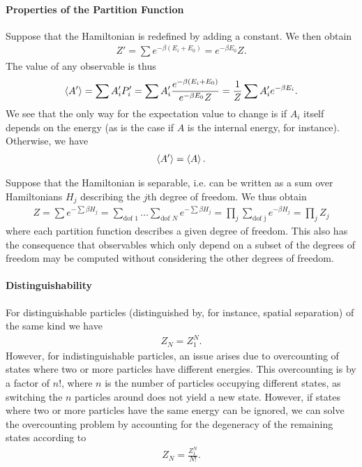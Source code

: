 \paragraph{Properties of the Partition Function}
Suppose that the Hamiltonian is redefined by adding a constant. We then obtain
\begin{align*}
	Z' = \sum e^{-\beta (E_{i} + E_{0})} = e^{-\beta E_{0}}Z.
\end{align*}
The value of any observable is thus
\begin{align*}
	\expval{A'} = \sum A'_{i}P'_{i} = \sum A'_{i}\frac{e^{-\beta(E_{i} + E_{0})}}{e^{-\beta E_{0}}Z} = \frac{1}{Z}\sum A'_{i}e^{-\beta E_{i}}.
\end{align*}
We see that the only way for the expectation value to change is if $A_{i}$ itself depends on the energy (as is the case if $A$ is the internal energy, for instance). Otherwise, we have
\begin{align*}
	\expval{A'} = \expval{A}.
\end{align*}

Suppose that the Hamiltonian is separable, i.e. can be written as a sum over Hamiltonians $H_{j}$ describing the $j$th degree of freedom. We thus obtain
\begin{align*}
	Z = \sum e^{-\sum\beta H_{j}} = \sum\limits_{\text{dof 1}}\dots\sum\limits_{\text{dof }N}e^{-\sum\beta H_{j}} = \prod\limits_{j}\sum\limits_{\text{dof j}}e^{-\beta H_{j}} = \prod\limits_{j}Z_{j}
\end{align*}
where each partition function describes a given degree of freedom. This also has the consequence that observables which only depend on a subset of the degrees of freedom may be computed without considering the other degrees of freedom.

\paragraph{Distinguishability}
For distinguishable particles (distinguished by, for instance, spatial separation) of the same kind we have
\begin{align*}
	Z_{N} = Z_{1}^{N}.
\end{align*}
However, for indistinguishable particles, an issue arises due to overcounting of states where two or more particles have different energies. This overcounting is by a factor of $n!$, where $n$ is the number of particles occupying different states, as switching the $n$ particles around does not yield a new state. However, if states where two or more particles have the same energy can be ignored, we can solve the overcounting problem by accounting for the degeneracy of the remaining states according to
\begin{align*}
	Z_{N} = \frac{Z_{1}^{N}}{N!}.
\end{align*}

